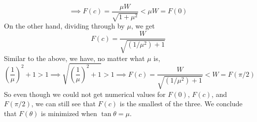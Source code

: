 \documentclass{article}
\begin{document}
\begin{enumerate}
\begin{equation*}
    \implies F(c) = \frac{\mu W}{\sqrt{1+\mu^2}} < \mu W = F(0)
  \end{equation*}
  On the other hand, dividing through by $\mu$, we get
  \begin{equation*}
    F(c) = \frac{W}{\sqrt{(1/\mu^2)+1}}
  \end{equation*}
  Similar to the above, we have, no matter what $\mu$ is,
  \begin{equation*}
    \left(\frac{1}{\mu}\right)^2+1 > 1
    \implies 
    \sqrt{\left(\frac{1}{\mu}\right)^2+1} > 1
    \implies
    F(c) = \frac{W}{\sqrt{(1/\mu^2)+1}} < W = F(\pi/2)
  \end{equation*}
  So even though we could not get numerical values for $F(0)$, $F(c)$, and
  $F(\pi/2)$, we can still see that $F(c)$ is the smallest of the three.  We
  conclude that $F(\theta)$ is minimized when $\tan\theta=\mu$.
\end{enumerate}
\end{document}
